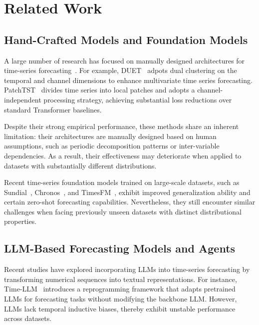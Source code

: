 \section{Related Work}

\subsection{Hand-Crafted Models and Foundation Models}

A large number of research has focused on manually designed architectures for time-series forecasting~\cite{CrossLinear,TimesNet,Duet,TimeXer}. For example, DUET~\cite{Duet} adpots dual clustering on the temporal and channel dimensions to enhance multivariate time series forecasting. PatchTST~\cite{PatchTST} divides time series into local patches and adopts a channel-independent processing strategy, achieving substantial loss reductions over standard Transformer baselines.%

Despite their strong empirical performance, these methods share an inherent limitation: their architectures are manually designed based on human assumptions, such as periodic decomposition patterns or inter-variable dependencies. As a result, their effectiveness may deteriorate when applied to datasets with substantially different distributions.%

Recent time-series foundation models trained on large-scale datasets, such as Sundial~\cite{Sundial}, Chronos~\cite{Chronos,Chronos2}, and TimesFM~\cite{TimesFM}, exhibit improved generalization ability and certain zero-shot forecasting capabilities. Nevertheless, they still encounter similar challenges when facing previously unseen datasets with distinct distributional properties.

\subsection{LLM-Based Forecasting Models and Agents}

Recent studies have explored incorporating LLMs into time-series forecasting by transforming numerical sequences into textual representations. For instance, Time-LLM~\cite{TimeLLM} introduces a reprogramming framework that adapts pretrained LLMs for forecasting tasks without modifying the backbone LLM. However, LLMs lack temporal inductive biases, thereby exhibit unstable performance across datasets.

